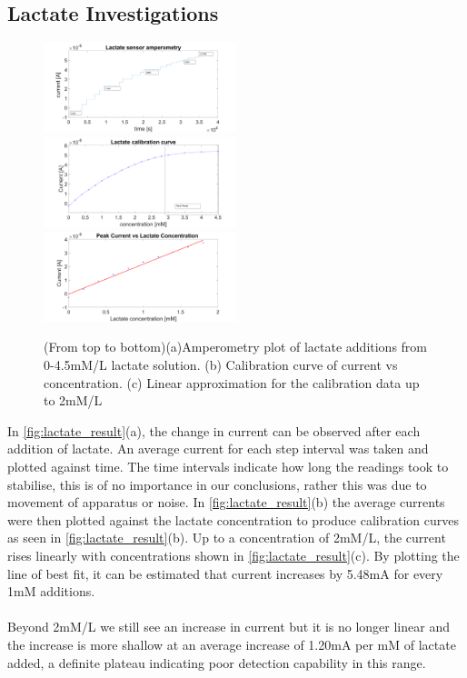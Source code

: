 \subsection{Lactate Investigations}
\begin{figure}[H]
    \centering
    \includegraphics[width=0.5\textwidth]{img/Lactate_fig_1.png}
    \includegraphics[width=0.5\textwidth]{img/Lactate_fig_2.png}
    \includegraphics[width=0.5\textwidth]{img/Lactate_fig_3.png}
    \caption{(From top to bottom)(a)Amperometry plot of lactate additions from 0-4.5mM/L lactate solution. (b) Calibration curve of current vs concentration. (c) Linear approximation for the calibration data up to 2mM/L}
    \label{fig:lactate_result}
\end{figure}
In \autoref{fig:lactate_result}(a), the change in current can be observed after each addition of lactate. An average current for each step interval was taken and plotted against time. The time intervals indicate how long the readings took to stabilise, this is of no importance in our conclusions, rather this was due to movement of apparatus or noise. In \autoref{fig:lactate_result}(b) the average currents were then plotted against the lactate concentration  to produce calibration curves as seen in \autoref{fig:lactate_result}(b). Up to a concentration of 2mM/L, the current rises linearly with concentrations shown in \autoref{fig:lactate_result}(c). By plotting the line of best fit, it can be estimated that current increases by 5.48mA for every 1mM additions. \\\\ 
Beyond 2mM/L we still see an increase in current but it is no longer linear and the increase is more shallow at an average increase of  1.20mA per mM of lactate added, a definite plateau indicating poor detection capability in this range. 
